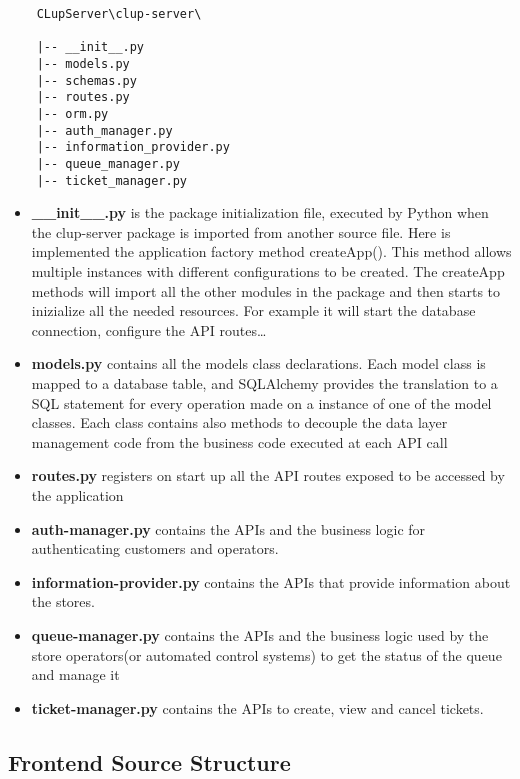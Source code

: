 \begin{lstlisting}
    CLupServer\clup-server\

    |-- __init__.py
    |-- models.py
    |-- schemas.py
    |-- routes.py
    |-- orm.py
    |-- auth_manager.py
    |-- information_provider.py
    |-- queue_manager.py
    |-- ticket_manager.py

\end{lstlisting}

\begin{itemize}
    \item \textbf{\_\_init\_\_.py} is the package initialization file, executed by Python when the clup-server package is imported from another source file. Here is implemented the application factory method createApp(). This method allows multiple instances with different configurations to be created. The createApp methods will import all the other modules in the package and then starts to inizialize all the needed resources. For example it will start the database connection, configure the API routes\ldots
    \item \textbf{models.py} contains all the models class declarations. Each model class is mapped to a database table, and SQLAlchemy provides the translation to a SQL statement for every operation made on a instance of one of the model classes. Each class contains also methods to decouple the data layer management code from the business code executed at each API call
    \item \textbf{routes.py} registers on start up all the API routes exposed to be accessed by the application
    \item \textbf{auth-manager.py} contains the APIs and the business logic for authenticating customers and operators.
    \item \textbf{information-provider.py} contains the APIs that provide information about the stores.
    \item \textbf{queue-manager.py} contains the APIs and the business logic used by the store operators(or automated control systems) to get the status of the queue and manage it
    \item \textbf{ticket-manager.py} contains the APIs to create, view and cancel tickets.
\end{itemize}

\clearpage

\subsection{Frontend Source Structure}

